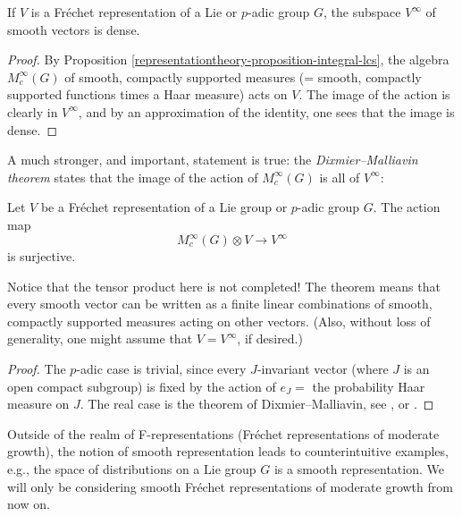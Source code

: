 \begin{lemma}
 \label{lemma-smooth-dense}
If $V$ is a Fr\'echet representation of a Lie or $p$-adic group $G$, the subspace $V^\infty$ of smooth vectors is dense.
\end{lemma}

\begin{proof}
 By Proposition \ref{representationtheory-proposition-integral-lcs}, the algebra $M_c^\infty(G)$ of smooth, compactly supported measures (= smooth, compactly supported functions times a Haar measure) acts on $V$. The image of the action is clearly in $V^\infty$, and by an approximation of the identity, one sees that the image is dense. 
\end{proof}

A much stronger, and important, statement is true: the {\it Dixmier--Malliavin theorem} states that the image of the action of $M_c^\infty(G)$ is all of $V^\infty$:

\begin{theorem}
 \label{theorem-Dixmier-Malliavin}
Let $V$ be a Fr\'echet representation of a Lie group or $p$-adic group $G$. The action map 
$$ M_c^\infty(G)\otimes V \to V^\infty$$
is surjective.
\end{theorem}

Notice that the tensor product here is not completed! The theorem means that every smooth vector can be written as a finite linear combinations of smooth, compactly supported measures acting on other vectors. (Also, without loss of generality, one might assume that $V=V^\infty$, if desired.)

\begin{proof}
The $p$-adic case is trivial, since every $J$-invariant vector (where $J$ is an open compact subgroup) is fixed by the action of $e_J=$ the probability Haar measure on $J$. The real case is the theorem of Dixmier--Malliavin, see \cite{Dixmier-Malliavin}, or \cite{Casselman-Dixmier-Malliavin}.
\end{proof}



\begin{remark}
\label{remark-smooth-not-SF}
Outside of the realm of F-representations (Fr\'echet representations of moderate growth), the notion of smooth representation leads to counterintuitive examples, e.g., the space of distributions on a Lie group $G$ is a smooth representation. We will only be considering smooth Fr\'echet representations of moderate growth from now on.
\end{remark}

